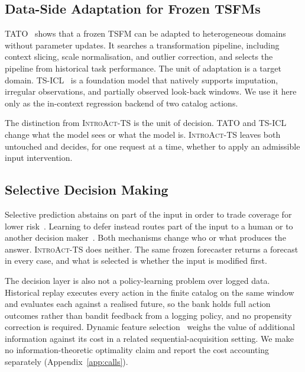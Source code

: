\documentclass{article}
\newcommand{\introact}{\textsc{IntroAct-TS}}
\newcommand{\tsfm}{TSFM}
\begin{document}
\subsection{Data-Side Adaptation for Frozen \tsfm{}s}
\label{sec:related-dataside}
TATO~\citep{qiu2026tato} shows that a frozen \tsfm{} can be adapted to heterogeneous domains
without parameter updates. It searches a transformation pipeline, including context slicing,
scale normalisation, and outlier correction, and selects the pipeline from historical task
performance. The unit of adaptation is a target domain. TS-ICL~\citep{tsicl2026} is a
foundation model that natively supports imputation, irregular observations, and partially
observed look-back windows. We use it here only as the in-context regression backend of two
catalog actions.

The distinction from \introact{} is the unit of decision. TATO and TS-ICL change what the
model sees or what the model is. \introact{} leaves both untouched and decides, for one
request at a time, whether to apply an admissible input intervention.

\subsection{Selective Decision Making}
\label{sec:related-selective}
Selective prediction abstains on part of the input in order to trade coverage for lower
risk~\citep{chow1970optimum,vovk2005algorithmic,geifman2017selective,lei2018distribution}.
Learning to defer instead routes part of the input to a human or to another decision
maker~\citep{madras2018predict,mozannar2020consistent}. Both mechanisms change who or what
produces the answer. \introact{} does neither. The same frozen forecaster returns a forecast
in every case, and what is selected is whether the input is modified first.

The decision layer is also not a policy-learning problem over logged data. Historical replay
executes every action in the finite catalog on the same window and evaluates each against a
realised future, so the bank holds full action outcomes rather than bandit feedback from a
logging policy, and no propensity correction is required. Dynamic feature
selection~\citep{he2024dime} weighs the value of additional information against its cost in a
related sequential-acquisition setting. We make no information-theoretic optimality claim and
report the cost accounting separately (Appendix~\ref{app:calls}).

\end{document}
